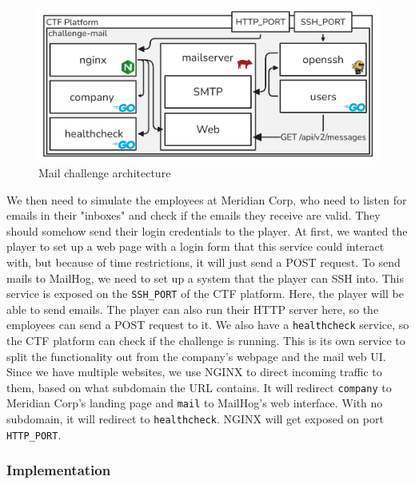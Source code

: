 \begin{figure}[H]
    \centering
    \includegraphics[width=0.9\linewidth]{img/challenge-mail--architecture.png}
    \vspace{-1\baselineskip} %
    \caption{Mail challenge architecture}
    \label{fig:mail-architecture}
\end{figure}
\noindent
We then need to simulate the employees at Meridian Corp, who need to listen for emails in their "inboxes" and check if the emails they receive are valid. They should somehow send their login credentials to the player. At first, we wanted the player to set up a web page with a login form that this service could interact with, but because of time restrictions, it will just send a POST request. To send mails to MailHog, we need to set up a system that the player can SSH into. This service is exposed on the \texttt{SSH\_PORT} of the CTF platform. Here, the player will be able to send emails. The player can also run their HTTP server here, so the employees can send a POST request to it. We also have a \texttt{healthcheck} service, so the CTF platform can check if the challenge is running. This is its own service to split the functionality out from the company's webpage and the mail web UI. Since we have multiple websites, we use NGINX to direct incoming traffic to them, based on what subdomain the URL contains. It will redirect \texttt{company} to Meridian Corp's landing page and \texttt{mail} to MailHog's web interface. With no subdomain, it will redirect to \texttt{healthcheck}. NGINX will get exposed on port \texttt{HTTP\_PORT}.

\subsubsection{Implementation}

